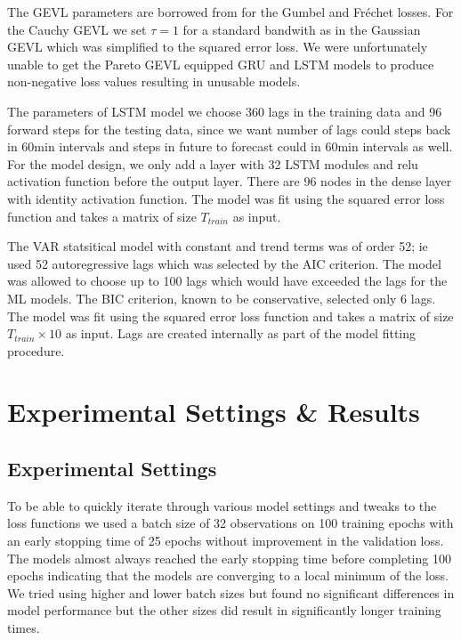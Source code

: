 \documentclass[conference]{IEEEtran}
\begin{document}
The GEVL parameters are borrowed from \cite{zhangEnhancingTimeSeries2021} for the Gumbel and Fr\'echet losses. For the Cauchy GEVL we set $\tau = 1$ for a standard bandwith as in the Gaussian GEVL which was simplified to the squared error loss. We were unfortunately unable to get the Pareto GEVL equipped GRU and LSTM models to produce non-negative loss values resulting in unusable models.

The parameters of LSTM model we choose 360 lags in the training data and 96 forward steps for the testing data, since we want number of lags could steps back in 60min intervals and steps in future to forecast could in 60min intervals as well. For the model design, we only add a layer with 32 LSTM modules and relu activation function before the output layer. There are 96 nodes in the dense layer with identity activation function. The model was fit using the squared error loss function and takes a matrix of size $T_{train}$ as input.

The VAR statsitical model with constant and trend terms was of order 52; ie used 52 autoregressive lags which was selected by the AIC criterion. The model was allowed to choose up to 100 lags which would have exceeded the lags for the ML models. The BIC criterion, known to be conservative, selected only 6 lags. The model was fit using the squared error loss function and takes a matrix of size $T_{train} \times 10$ as input. Lags are created internally as part of the model fitting procedure.

\section{Experimental Settings \& Results}


\subsection{Experimental Settings}

To be able to quickly iterate through various model settings and tweaks to the loss functions we used a batch size of 32 observations on 100 training epochs with an early stopping time of 25 epochs without improvement in the validation loss. The models almost always reached the early stopping time before completing 100 epochs indicating that the models are converging to a local minimum of the loss. We tried using higher and lower batch sizes but found no significant differences in model performance but the other sizes did result in significantly longer training times.
\end{document}
